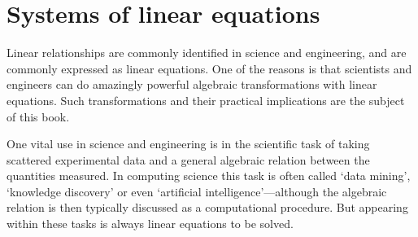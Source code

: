 
\chapter{Systems of linear equations}
\label{ch:sle}

\minitoc


Linear relationships are commonly identified in science and engineering, and are commonly expressed as linear equations.
One of the reasons is that scientists and engineers can do amazingly powerful algebraic transformations with linear equations.
Such transformations and their practical implications are the subject of this book.

One vital use in science and engineering is in the scientific task of taking scattered experimental data and  a general algebraic relation between the quantities measured.
In computing science this task is often called `data mining', `knowledge discovery' or even `artificial intelligence'---although  the algebraic relation is then typically discussed as a computational procedure.
But appearing within these tasks is always linear equations to be solved.

